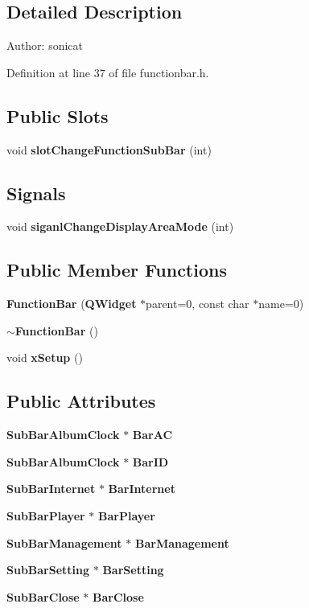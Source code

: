 \subsection{Detailed Description}
\begin{Desc}
\item[Author:]sonicat \end{Desc}




Definition at line 37 of file functionbar.h.\subsection*{Public Slots}
\begin{CompactItemize}
\item 
void {\bf slot\-Change\-Function\-Sub\-Bar} (int)
\end{CompactItemize}
\subsection*{Signals}
\begin{CompactItemize}
\item 
void {\bf siganl\-Change\-Display\-Area\-Mode} (int)
\end{CompactItemize}
\subsection*{Public Member Functions}
\begin{CompactItemize}
\item 
{\bf Function\-Bar} ({\bf QWidget} $\ast$parent=0, const char $\ast$name=0)
\item 
{\bf $\sim$Function\-Bar} ()
\item 
void {\bf x\-Setup} ()
\end{CompactItemize}
\subsection*{Public Attributes}
\begin{CompactItemize}
\item 
{\bf Sub\-Bar\-Album\-Clock} $\ast$ {\bf Bar\-AC}
\item 
{\bf Sub\-Bar\-Album\-Clock} $\ast$ {\bf Bar\-ID}
\item 
{\bf Sub\-Bar\-Internet} $\ast$ {\bf Bar\-Internet}
\item 
{\bf Sub\-Bar\-Player} $\ast$ {\bf Bar\-Player}
\item 
{\bf Sub\-Bar\-Management} $\ast$ {\bf Bar\-Management}
\item 
{\bf Sub\-Bar\-Setting} $\ast$ {\bf Bar\-Setting}
\item 
{\bf Sub\-Bar\-Close} $\ast$ {\bf Bar\-Close}
\end{CompactItemize}
